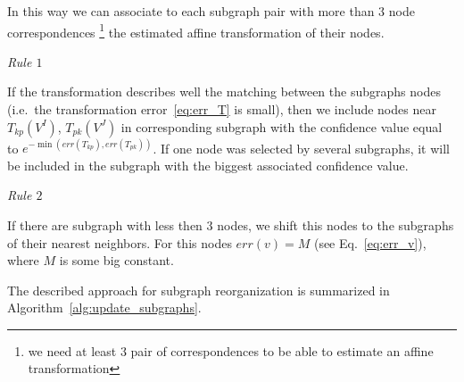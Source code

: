 In this way we can associate to each subgraph pair with more than $3$ node correspondences \footnote{we need at least $3$ pair of correspondences to be able to estimate an affine transformation} the estimated affine transformation of their nodes.

\textit{Rule $1$}

If the transformation describes well the matching between the subgraphs nodes (i.e.\ the transformation error~\ref{eq:err_T} is small), then we include nodes near $T_{kp}(V^I)$, $T_{pk}(V^J)$ in corresponding subgraph with the confidence value equal to $e^{-\min(err(T_{kp}), err(T_{pk}))}$. If one node was selected by several subgraphs, it will be included in the subgraph with the biggest associated confidence value.

\textit{Rule $2$}

If there are subgraph with less then $3$ nodes, we shift this nodes to the subgraphs of their nearest neighbors. For this nodes $err(v)=M$ (see Eq.~\ref{eq:err_v}), where $M$ is some big constant. 

The described approach for subgraph reorganization is summarized in Algorithm~\ref{alg:update_subgraphs}.


